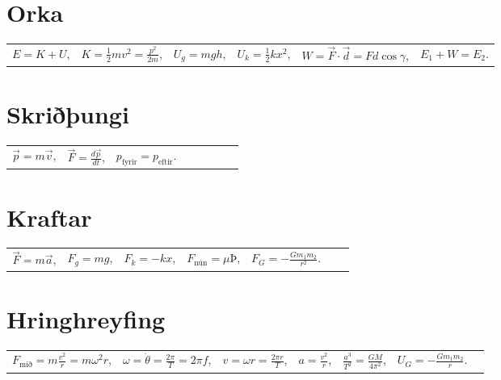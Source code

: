 \section*{Orka}

\begin{table}[H]
\begin{tabular}{llllll}
$E = K + U$, & $K = \frac{1}{2}mv^2 = \frac{p^2}{2m}$, & $U_{g} = mgh$, & $U_{k} = \frac{1}{2}kx^2$, & $W = \Vec{F} \cdot \Vec{d} = Fd\cos\gamma$, & $E_1 + W = E_2$.
\end{tabular}
\end{table}

\section*{Skriðþungi}

\begin{table}[H]
\begin{tabular}{llllllll}
$\Vec{p} = m\Vec{v}$, & $\Vec{F} = \frac{d\Vec{p}}{dt}$, & $p_{\text{fyrir}} = p_{\text{eftir}}$.
\end{tabular}
\end{table}

\section*{Kraftar}

\begin{table}[H]
\begin{tabular}{lllllll}
$\Vec{F} = m\Vec{a}$, & $F_g = mg$, & $F_{k}= -kx$, & $F_{\text{nún}} = \mu \text{Þ}$, & $F_{G} = -\frac{Gm_1m_2}{r^2}$.
\end{tabular}
\end{table}

\section*{Hringhreyfing}

\begin{table}[H]
\begin{tabular}{lllllll}
$F_{\text{mið}} = m\frac{v^2}{r} = m\omega^2r$, & $\omega = \Dot{\theta} = \frac{2\pi}{T} = 2\pi f$, & $v = \omega r = \frac{2\pi r}{T}$, & $a = \frac{v^2}{r}$, & $\frac{a^3}{T^2} = \frac{GM}{4\pi^2}$, & $U_G = - \frac{Gm_1 m_2}{r}$.
\end{tabular}
\end{table}

\newpage

